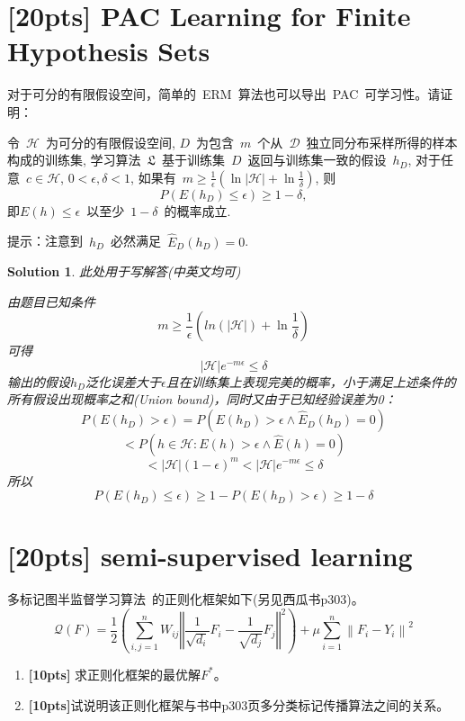 \documentclass[a4paper,UTF8]{article}
\newtheorem*{solution}{Solution}
\numberwithin{equation}{section}
\begin{document}
\newpage
\section{[20pts] PAC Learning for Finite Hypothesis Sets}
对于可分的有限假设空间，简单的~ERM~算法也可以导出~PAC~可学习性。请证明：

令~$\mathcal{H}$~为可分的有限假设空间, $D$~为包含~$m$~个从~$\mathcal{D}$~独立同分布采样所得的样本构成的训练集, 学习算法~$\mathfrak{L}$~基于训练集~$D$~返回与训练集一致的假设~$h_D$, 对于任意~$c\in \mathcal{H}$, $0<\epsilon, \delta < 1$, 如果有~$m \geq \frac{1}{\epsilon}(\ln|\mathcal{H}|+\ln\frac{1}{\delta})$, 则
\begin{equation}
    P\left(E(h_D)\leq\epsilon\right)\geq 1-\delta,
\end{equation}
即$E(h)\leq\epsilon$~以至少~$1-\delta$~的概率成立.

\noindent 提示：注意到~$h_D$~必然满足~$\widehat{E}_D(h_D) = 0$.

\begin{solution}
此处用于写解答(中英文均可)

由题目已知条件$$m\ge\frac 1 \epsilon(ln(|\mathcal H|)+\ln\frac 1 \delta)$$
可得$$|\mathcal H|e^{-m\epsilon} \le \delta$$
输出的假设$h_D$泛化误差大于$\epsilon$且在训练集上表现完美的概率，小于满足上述条件的所有假设出现概率之和(Union bound)，同时又由于已知经验误差为0：
$$P(E(h_D)>\epsilon)=P(E(h_D)>\epsilon \land \widehat{E}_D(h_D)=0)$$
$$<P(h\in \mathcal H:E(h)>\epsilon\land \widehat{E}(h)=0)$$
$$<|\mathcal H|(1-\epsilon)^m<|\mathcal H|e^{-m\epsilon}\le\delta$$
所以
$$P(E(h_D)\le\epsilon)\ge1-P(E(h_D)>\epsilon)\ge 1-\delta$$
\end{solution}

\section{\textbf{[20pts]} semi-supervised learning}
	多标记图半监督学习算法~\citep{conf/nips/ZhouBLWS03}的正则化框架如下(另见西瓜书p303)。
\begin{equation}
\mathcal{Q}(F)=\frac{1}{2}\left(\sum_{i, j=1}^{n} W_{i j}\left\Vert\frac{1}{\sqrt{d_{i}}} F_{i}-\frac{1}{\sqrt{d_{j}}} F_{j}\right\Vert^{2}\right)+\mu \sum_{i=1}^{n}\left\|F_{i}-Y_{i}\right\|^{2}
\end{equation}
\begin{enumerate}
	\item  \textbf{[10pts]} 求正则化框架的最优解$F^*$。
	\item  \textbf{[10pts]}试说明该正则化框架与书中p303页多分类标记传播算法之间的关系。
\end{enumerate}
\end{document}
